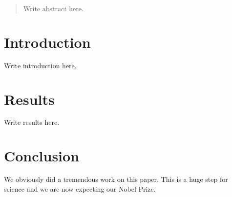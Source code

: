 \documentclass{article}
\begin{document}
\begin{abstract}
Write abstract here.
\end{abstract}

\section{Introduction}

Write introduction here.

\section{Results}

Write results here.

\section{Conclusion}

We obviously did a tremendous work on this paper. This is a huge step for science and we are now expecting our Nobel Prize.
\end{document}
